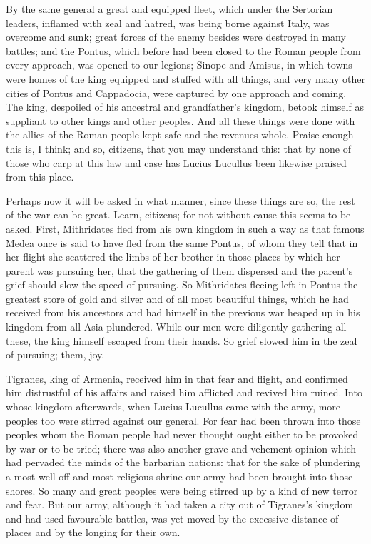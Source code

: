  By the same general a great and equipped fleet, which under the Sertorian leaders, inflamed with zeal and hatred, was being borne against Italy, was overcome and sunk; great forces of the enemy besides were destroyed in many battles; and the Pontus, which before had been closed to the Roman people from every approach, was opened to our legions; Sinope and Amisus, in which towns were homes of the king equipped and stuffed with all things, and very many other cities of Pontus and Cappadocia, were captured by one approach and coming. The king, despoiled of his ancestral and grandfather's kingdom, betook himself as suppliant to other kings and other peoples. And all these things were done with the allies of the Roman people kept safe and the revenues whole. Praise enough this is, I think; and so, citizens, that you may understand this: that by none of those who carp at this law and case has Lucius Lucullus been likewise praised from this place.

 Perhaps now it will be asked in what manner, since these things are so, the rest of the war can be great. Learn, citizens; for not without cause this seems to be asked. First, Mithridates fled from his own kingdom in such a way as that famous Medea once is said to have fled from the same Pontus, of whom they tell that in her flight she scattered the limbs of her brother in those places by which her parent was pursuing her, that the gathering of them dispersed and the parent's grief should slow the speed of pursuing. So Mithridates fleeing left in Pontus the greatest store of gold and silver and of all most beautiful things, which he had received from his ancestors and had himself in the previous war heaped up in his kingdom from all Asia plundered. While our men were diligently gathering all these, the king himself escaped from their hands. So grief slowed him in the zeal of pursuing; them, joy.

 Tigranes, king of Armenia, received him in that fear and flight, and confirmed him distrustful of his affairs and raised him afflicted and revived him ruined. Into whose kingdom afterwards, when Lucius Lucullus came with the army, more peoples too were stirred against our general. For fear had been thrown into those peoples whom the Roman people had never thought ought either to be provoked by war or to be tried; there was also another grave and vehement opinion which had pervaded the minds of the barbarian nations: that for the sake of plundering a most well-off and most religious shrine our army had been brought into those shores. So many and great peoples were being stirred up by a kind of new terror and fear. But our army, although it had taken a city out of Tigranes's kingdom and had used favourable battles, was yet moved by the excessive distance of places and by the longing for their own.


